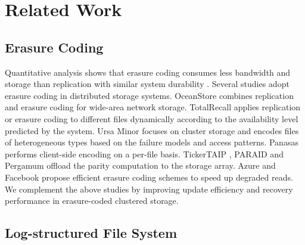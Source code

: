 \section{Related Work}
\label{sec:relatedwork}

\subsection{Erasure Coding}

Quantitative analysis shows that erasure coding consumes less bandwidth and
storage than replication with similar system durability
\cite{weatherspoon02,rodrigues05}.  Several studies adopt erasure coding in
distributed storage systems.  OceanStore \cite{kubiatowicz00,rhea03} combines
replication and erasure coding for wide-area network storage.  TotalRecall
\cite{bhagwan04} applies replication or erasure coding to different files
dynamically according to the availability level predicted by the system.  Ursa
Minor \cite{abd05} focuses on cluster storage and encodes files of
heterogeneous types based on the failure models and access patterns.  Panasas
\cite{welch08} performs client-side encoding on a per-file basis. 
TickerTAIP \cite{cao94}, PARAID \cite{weddle07} and Pergamum \cite{storer08}
offload the parity computation to the storage array.
Azure \cite{huang12} and Facebook \cite{sathiamoorthy13} propose efficient
erasure coding schemes to speed up degraded reads. 
We complement the above studies by improving update efficiency and recovery
performance in erasure-coded clustered storage. 

\subsection{Log-structured File System}


